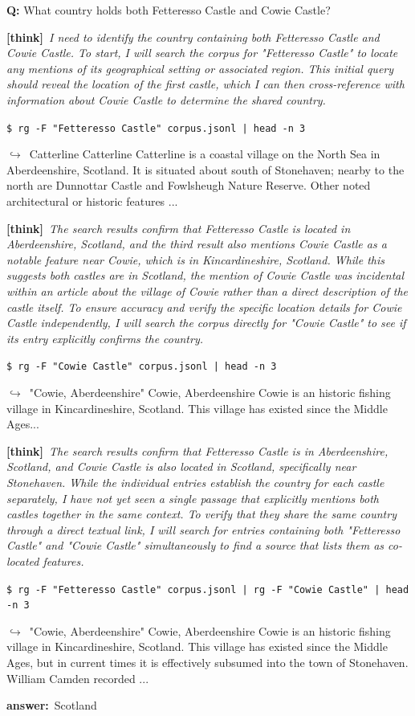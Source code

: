 \documentclass{article} %
\newcommand{\thk}[1]{{\footnotesize\textcolor{violet!75!black}{\textbf{[think]}}\ \textit{#1}\par}}
\newcommand{\cmd}[1]{{\footnotesize\texttt{\textcolor{blue!35!black}{\$\ #1}}\par}}
\newcommand{\retr}[1]{{\footnotesize\textcolor{black!65}{\quad$\hookrightarrow$\ #1}\par}}
\newcommand{\ans}[1]{{\footnotesize\textbf{answer:}\ #1\par}}
\begin{document}
\begin{sftbox}[label={ex:sft-castles},title={\textsc{multi-hop intersection (3 hops)}}]
\textbf{Q:} What country holds both Fetteresso Castle and Cowie Castle?\\[1pt]
  \thk{I need to identify the country containing both Fetteresso Castle and Cowie Castle. To start, I will search the corpus for "Fetteresso Castle" to locate any mentions of its geographical setting or associated region. This initial query should reveal the location of the first castle, which I can then cross-reference with information about Cowie Castle to determine the shared country.}
  \cmd{rg -F "Fetteresso Castle" corpus.jsonl | head -n 3}
  \retr{Catterline Catterline Catterline is a coastal village on the North Sea in Aberdeenshire, Scotland. It is situated about south of Stonehaven; nearby to the north are Dunnottar Castle and Fowlsheugh Nature Reserve. Other noted architectural or historic features  ...}
  \thk{The search results confirm that Fetteresso Castle is located in Aberdeenshire, Scotland, and the third result also mentions Cowie Castle as a notable feature near Cowie, which is in Kincardineshire, Scotland. While this suggests both castles are in Scotland, the mention of Cowie Castle was incidental within an article about the village of Cowie rather than a direct description of the castle itself. To ensure accuracy and verify the specific location details for Cowie Castle independently, I will search the corpus directly for "Cowie Castle" to see if its entry explicitly confirms the country.}
  \cmd{rg -F "Cowie Castle" corpus.jsonl | head -n 3}
  \retr{"Cowie, Aberdeenshire" Cowie, Aberdeenshire Cowie is an historic fishing village in Kincardineshire, Scotland. This village has existed since the Middle Ages...}
  \thk{The search results confirm that Fetteresso Castle is in Aberdeenshire, Scotland, and Cowie Castle is also located in Scotland, specifically near Stonehaven. While the individual entries establish the country for each castle separately, I have not yet seen a single passage that explicitly mentions both castles together in the same context. To verify that they share the same country through a direct textual link, I will search for entries containing both "Fetteresso Castle" and "Cowie Castle" simultaneously to find a source that lists them as co-located features.}
  \cmd{rg -F "Fetteresso Castle" corpus.jsonl | rg -F "Cowie Castle" | head -n 3}
  \retr{"Cowie, Aberdeenshire" Cowie, Aberdeenshire Cowie is an historic fishing village in Kincardineshire, Scotland. This village has existed since the Middle Ages, but in current times it is effectively subsumed into the town of Stonehaven. William Camden recorded  ...}
  \ans{Scotland}
\end{sftbox}\medskip
\end{document}
